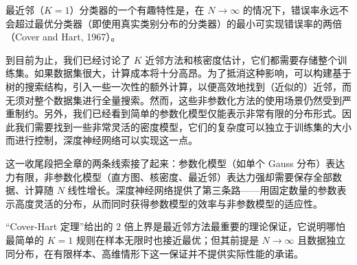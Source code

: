 \documentclass[../../main.tex]{subfiles}
\begin{document}
最近邻（$K=1$）分类器的一个有趣特性是，在 $N\to\infty$ 的情况下，错误率永远不会超过最优分类器（即使用真实类别分布的分类器）的最小可实现错误率的两倍（Cover and Hart, 1967）。

到目前为止，我们已经讨论了 $K$ 近邻方法和核密度估计，它们都需要存储整个训练集。如果数据集很大，计算成本将十分高昂。为了抵消这种影响，可以构建基于树的搜索结构，引入一些一次性的额外计算，以便高效地找到（近似的）近邻，而无须对整个数据集进行全量搜索。然而，这些非参数化方法的使用场景仍然受到严重制约。另外，我们已经看到简单的参数化模型仅能表示非常有限的分布形式。因此我们需要找到一些非常灵活的密度模型，它们的复杂度可以独立于训练集的大小而进行控制，深度神经网络可以实现这一点。

\begin{remark}
这一收尾段把全章的两条线索接了起来：参数化模型（如单个 Gauss 分布）表达力有限，非参数化模型（直方图、核密度、最近邻）表达力强却需要保存全部数据、计算随 $N$ 线性增长。深度神经网络提供了第三条路——用固定数量的参数表示高度灵活的分布，从而同时获得参数模型的效率与非参数模型的适应性。

“Cover-Hart 定理”给出的 $2$ 倍上界是最近邻方法最重要的理论保证，它说明哪怕最简单的 $K=1$ 规则在样本无限时也接近最优；但其前提是 $N\to\infty$ 且数据独立同分布，在有限样本、高维情形下这一保证并不提供实际性能的承诺。
\end{remark}
\end{document}
